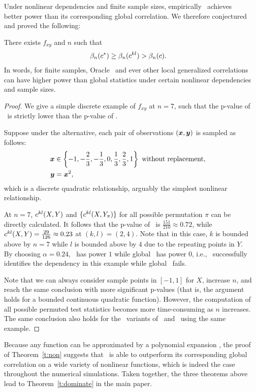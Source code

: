 \documentclass[11pt]{extarticle}
\begin{document}
Under nonlinear dependencies and finite sample sizes, empirically \Mgc~achieves better power than its corresponding global correlation.
We therefore conjectured and proved the following:
\begin{thm}
\label{t:non}
There exists $f_{xy}$ and $n$ such that
\begin{equation}
\beta_n(c^*) \geq \beta_n(c^{kl}) > \beta_n(c).
\end{equation}
In words, for finite samples, Oracle \Mgc~and ever other local generalized correlations can have higher power than global statistics under certain nonlinear dependencies and sample sizes.
\end{thm}
\begin{proof}
We give a simple discrete example of $f_{xy}$ at $n=7$, such that the p-value of \Mgc~is strictly lower than the p-value of \Mcorr.

Suppose under the alternative, each pair of observations $(\boldsymbol{x},\boldsymbol{y})$ is sampled as follows:
\begin{align*}
\boldsymbol{x} &\in \left\{-1,-\frac{2}{3},-\frac{1}{3},0,\frac{1}{3},\frac{2}{3},1\right\} \mbox{ without replacement}, \\
\boldsymbol{y} &= \boldsymbol{x}^2,
\end{align*}
which is a discrete quadratic relationship, arguably the simplest nonlinear relationship.

At $n=7$, $c^{kl}(X, Y)$ and $\{c^{kl}(X, Y_{\pi})\}$ for all possible permutation $\pi$ can be directly calculated.
It follows that the p-value of \Mcorr~is $\frac{151}{210} \approx 0.72$, while $c^{kl}(X, Y)=\frac{29}{126} \approx 0.23$ at $(k,l)=(2,4)$. Note that in this case, $k$ is bounded above by $n=7$ while $l$ is bounded above by $4$ due to the repeating points in $Y$.
By choosing $\alpha = 0.24$, \Mgc~has power $1$ while global \Mcorr~has power $0$, i.e., \Mgc~successfully identifies the dependency in this example while global \Mcorr~fails.

Note that we can always consider sample points in $[-1,1]$ for $X$, increase $n$, and reach the same conclusion with more significant p-values (that is, the argument holds for a bounded continuous quadratic function).
However, the computation of all possible permuted test statistics becomes more time-consuming as $n$ increases. The same conclusion also holds for the \Mgc~variants of \Dcorr~and \Mantel~using the same example.
\end{proof}

Because any function can be approximated by a polynomial expansion \cite{RudinBook}, the proof of Theorem~\ref{t:non} suggests that \Mgc~is able to outperform its corresponding global correlation on a wide variety of nonlinear functions, which is indeed the case throughout the numerical simulations. Taken together, the three theorems above lead to Theorem~\ref{t:dominate} in the main paper.
\end{document}
